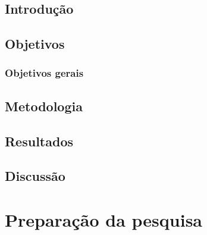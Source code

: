 \documentclass[
	12pt,				%
	oneside,
	a4paper,			%
	english,			%
	spanish,			%
	brazil				%
	]{abntex2}
\begin{document}
\chapter{Introdução}




\chapter{Objetivos}

\section{Objetivos gerais}



\chapter{Metodologia}



\chapter{Resultados}



\chapter{Discussão}



\part{Preparação da pesquisa}


\end{document}
